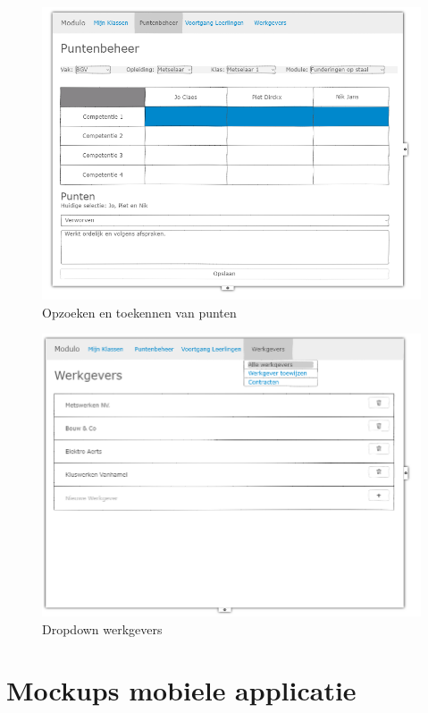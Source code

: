 \documentclass[a4paper]{article}
\begin{document}
\begin{appendices}
\begin{figure}[H]
  \centerline{\includegraphics[width=\textwidth]{web_punten}}
  \caption{Opzoeken en toekennen van punten}
  \label{fig:web_punten}
\end{figure}

\begin{figure}[H]
  \centerline{\includegraphics[width=\textwidth]{web_werkgevers_dropdown}}
  \caption{Dropdown werkgevers}
  \label{fig:web_werkgevers_dropdown}
\end{figure}

\newpage
\section{Mockups mobiele applicatie}


\end{appendices}
\end{document}

